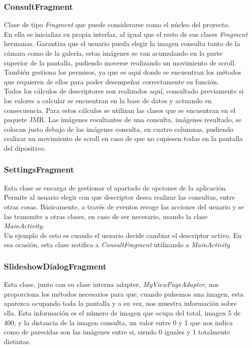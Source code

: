 \subsubsection{ConsultFragment}

Clase de tipo \textit{Fragment} que puede considerarse como el núcleo del proyecto.\\

En ella se inicializa su propia interfaz, al igual que el resto de sus clases \textit{Fragment} hermanas. Garantiza que el usuario pueda elegir la imagen consulta tanto de la cámara como de la galería, estas imágenes se van acumulando en la parte superior de la pantalla, pudiendo moverse realizando un movimiento de scroll. También gestiona los permisos, ya que es aquí donde se encuentran los métodos que requieren de ellos para poder desempeñar correctamente su función.\\

Todos los cálculos de descriptores son realizados aquí, consultado previamente si los valores a calcular se encuentran en la base de datos y actuando en consecuencia. Para estos cálculos se utilizan las clases que se encuentran en el paquete JMR. Las imágenes resultantes de una consulta, imágenes resultado, se colocan justo debajo de las imágenes consulta, en cuatro columnas, pudiendo realizar un movimiento de scroll en caso de que no cupiesen todas en la pantalla del dipositivo.

\subsubsection{SettingsFragment}

Esta clase se encarga de gestionar el apartado de opciones de la aplicación. Permite al usuario elegir con que descriptor desea realizar las consultas, entre otras cosas. Básicamente, a través de eventos recoge las acciones del usuario y se las transmite a otras clases, en caso de ser necesario, usando la clase \textit{MainActivity}.\\

Un ejemplo de esto es cuando el usuario decide cambiar el descriptor activo. En esa ocasión, esta clase notifica a \textit{ConsultFragment} utilizando a \textit{MainActivity}

\subsubsection{SlideshowDialogFragment}

Esta clase, junto con su clase interna adapter, \textit{MyViewPageAdapter}, nos proporciona los métodos necesarios para que, cuando pulsemos una imagen, esta aparezca ocupando toda la pantalla y a su vez, nos muestra información sobre ella. Esta información es el número de imagen que ocupa del total, imagen 5 de 400, y la distancia de la imagen consulta, un valor entre 0 y 1 que nos indica como de parecidas son las imágenes entre si, siendo 0 iguales y 1 totalmente distintas.

